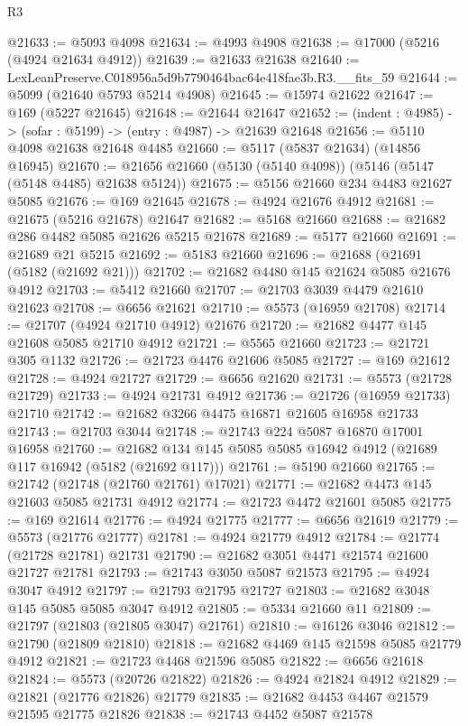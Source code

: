 \begin{lexlean}{R3}
\begin{coremodule}
@21633 := @5093 @4098
@21634 := @4993 @4908
@21638 := @17000 (@5216 (@4924 @21634 @4912))
@21639 := @21633 @21638
@21640 := LexLeanPreserve.C018956a5d9b7790464bac64e418fae3b.R3.__fits_59
@21644 := @5099 (@21640 @5793 @5214 @4908)
@21645 := @15974 @21622
@21647 := @169 (@5227 @21645)
@21648 := @21644 @21647
@21652 := (indent : @4985) -> (sofar : @5199) -> (entry : @4987) -> @21639 @21648
@21656 := @5110 @4098 @21638 @21648 @4485
@21660 := @5117 (@5837 @21634) (@14856 @16945)
@21670 := @21656 @21660 (@5130 (@5140 @4098)) (@5146 (@5147 (@5148 @4485) @21638 @5124))
@21675 := @5156 @21660 @234 @4483 @21627 @5085
@21676 := @169 @21645
@21678 := @4924 @21676 @4912
@21681 := @21675 (@5216 @21678) @21647
@21682 := @5168 @21660
@21688 := @21682 @286 @4482 @5085 @21626 @5215 @21678
@21689 := @5177 @21660
@21691 := @21689 @21 @5215
@21692 := @5183 @21660
@21696 := @21688 (@21691 (@5182 (@21692 @21)))
@21702 := @21682 @4480 @145 @21624 @5085 @21676 @4912
@21703 := @5412 @21660
@21707 := @21703 @3039 @4479 @21610 @21623
@21708 := @6656 @21621
@21710 := @5573 (@16959 @21708)
@21714 := @21707 (@4924 @21710 @4912) @21676
@21720 := @21682 @4477 @145 @21608 @5085 @21710 @4912
@21721 := @5565 @21660
@21723 := @21721 @305 @1132
@21726 := @21723 @4476 @21606 @5085
@21727 := @169 @21612
@21728 := @4924 @21727
@21729 := @6656 @21620
@21731 := @5573 (@21728 @21729)
@21733 := @4924 @21731 @4912
@21736 := @21726 (@16959 @21733) @21710
@21742 := @21682 @3266 @4475 @16871 @21605 @16958 @21733
@21743 := @21703 @3044
@21748 := @21743 @224 @5087 @16870 @17001 @16958
@21760 := @21682 @134 @145 @5085 @5085 @16942 @4912 (@21689 @117 @16942 (@5182 (@21692 @117)))
@21761 := @5190 @21660
@21765 := @21742 (@21748 (@21760 @21761) @17021)
@21771 := @21682 @4473 @145 @21603 @5085 @21731 @4912
@21774 := @21723 @4472 @21601 @5085
@21775 := @169 @21614
@21776 := @4924 @21775
@21777 := @6656 @21619
@21779 := @5573 (@21776 @21777)
@21781 := @4924 @21779 @4912
@21784 := @21774 (@21728 @21781) @21731
@21790 := @21682 @3051 @4471 @21574 @21600 @21727 @21781
@21793 := @21743 @3050 @5087 @21573
@21795 := @4924 @3047 @4912
@21797 := @21793 @21795 @21727
@21803 := @21682 @3048 @145 @5085 @5085 @3047 @4912
@21805 := @5334 @21660 @11
@21809 := @21797 (@21803 (@21805 @3047) @21761)
@21810 := @16126 @3046
@21812 := @21790 (@21809 @21810)
@21818 := @21682 @4469 @145 @21598 @5085 @21779 @4912
@21821 := @21723 @4468 @21596 @5085
@21822 := @6656 @21618
@21824 := @5573 (@20726 @21822)
@21826 := @4924 @21824 @4912
@21829 := @21821 (@21776 @21826) @21779
@21835 := @21682 @4453 @4467 @21579 @21595 @21775 @21826
@21838 := @21743 @4452 @5087 @21578

\end{coremodule}
\end{lexlean}
